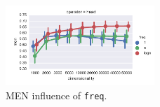 \begin{figure}[h]
  \centering

  \includegraphics[width=0.5\textwidth]{supplement/figures/men-interaction-freq}

  \caption{MEN influence of \texttt{freq}.}
  \label{fig:men-freq}
\end{figure}
